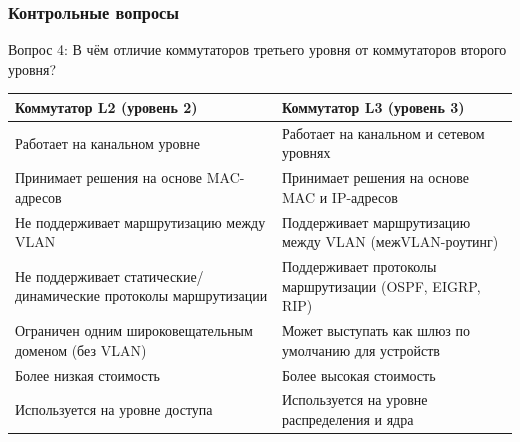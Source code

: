 \begin{frame}
\frametitle{Контрольные вопросы}
\begin{block}{Вопрос 4: В чём отличие коммутаторов третьего уровня от коммутаторов второго уровня?}
\begin{table}[h]
\centering
\begin{tabular}{|p{4cm}|p{4cm}|}
\hline
\textbf{Коммутатор L2 (уровень 2)} & \textbf{Коммутатор L3 (уровень 3)} \\
\hline
Работает на канальном уровне & Работает на канальном и сетевом уровнях \\
\hline
Принимает решения на основе MAC-адресов & Принимает решения на основе MAC и IP-адресов \\
\hline
Не поддерживает маршрутизацию между VLAN & Поддерживает маршрутизацию между VLAN (межVLAN-роутинг) \\
\hline
Не поддерживает статические/динамические протоколы маршрутизации & Поддерживает протоколы маршрутизации (OSPF, EIGRP, RIP) \\
\hline
Ограничен одним широковещательным доменом (без VLAN) & Может выступать как шлюз по умолчанию для устройств \\
\hline
Более низкая стоимость & Более высокая стоимость \\
\hline
Используется на уровне доступа & Используется на уровне распределения и ядра \\
\hline
\end{tabular}
\end{table}
\end{block}
\end{frame}

